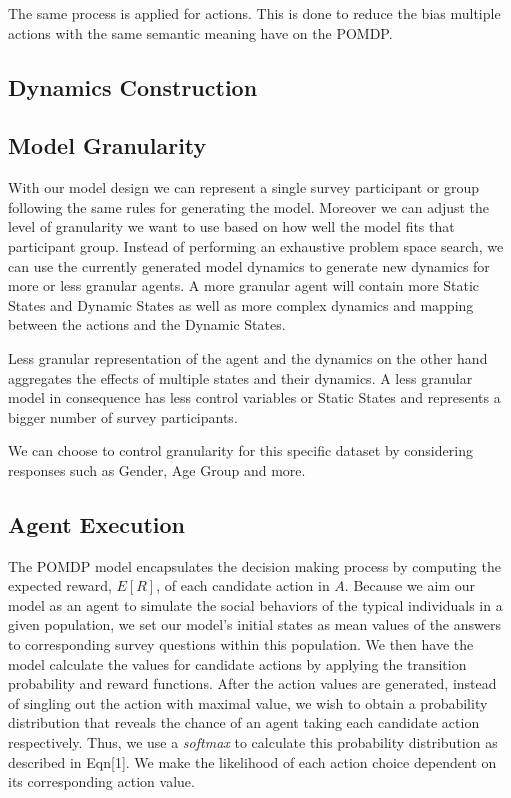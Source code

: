 {The same process is applied for actions. This is done to reduce the bias multiple actions with the same semantic meaning have on the POMDP.



\subsection{Dynamics Construction}


\subsection{Model Granularity}

With our model design we can represent a single survey participant or group following the same rules for generating the model. Moreover we can adjust the level of granularity we want to use based on how well the model fits that participant group. Instead of performing an exhaustive problem space search, we can use the currently generated model dynamics to generate new dynamics for more or less granular agents. A more granular agent will contain more Static States and Dynamic States as well as more complex dynamics and mapping between the actions and the Dynamic States. 

Less granular representation of the agent and the dynamics on the other hand aggregates the effects of multiple states and their dynamics. A less granular model in consequence has less control variables or Static States and represents a bigger number of survey participants.

We can choose to control granularity for this specific dataset by considering responses such as Gender, Age Group and more.


\subsection{Agent Execution}

The POMDP model encapsulates the decision making process by computing the expected reward, \(E[R]\), of each candidate action in \(A\). Because we aim our model as an agent to simulate the social behaviors of the typical individuals in a given population, we set our model's initial states as mean values of the answers to corresponding survey questions within this population. We then have the model calculate the values for candidate actions by applying the transition probability and reward functions. After the action values are generated, instead of singling out the action with maximal value, we wish to obtain a probability distribution that reveals the chance of an agent taking each candidate action respectively. Thus, we use a \textit{softmax} to calculate this probability distribution as described in Eqn[1]. We make the likelihood of each action choice dependent on its corresponding action value. 

}
